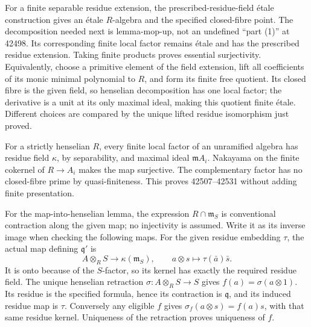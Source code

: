 For a finite separable residue extension, the prescribed-residue-field étale construction gives an étale \(R\)-algebra and the specified closed-fibre point. The decomposition needed next is lemma-mop-up, not an undefined ``part (1)'' at 42498. Its corresponding finite local factor remains étale and has the prescribed residue extension. Taking finite products proves essential surjectivity. Equivalently, choose a primitive element of the field extension, lift all coefficients of its monic minimal polynomial to \(R\), and form its finite free quotient. Its closed fibre is the given field, so henselian decomposition has one local factor; the derivative is a unit at its only maximal ideal, making this quotient finite étale. Different choices are compared by the unique lifted residue isomorphism just proved.

For a strictly henselian \(R\), every finite local factor of an unramified algebra has residue field \(\kappa\), by separability, and maximal ideal \(\mathfrak mA_i\). Nakayama on the finite cokernel of \(R\to A_i\) makes the map surjective. The complementary factor has no closed-fibre prime by quasi-finiteness. This proves 42507--42531 without adding finite presentation.

For the map-into-henselian lemma, the expression \(R\cap\mathfrak m_S\) is conventional contraction along the given map; no injectivity is assumed. Write it as its inverse image when checking the following maps. For the given residue embedding \(\tau\), the actual map defining \(\mathfrak q'\) is \[
A\otimes_RS\longrightarrow\kappa(\mathfrak m_S),
\qquad a\otimes s\longmapsto\tau(\bar a)\bar s.
\] It is onto because of the \(S\)-factor, so its kernel has exactly the required residue field. The unique henselian retraction \(\sigma:A\otimes_RS\to S\) gives \(f(a)=\sigma(a\otimes1)\). Its residue is the specified formula, hence its contraction is \(\mathfrak q\), and its induced residue map is \(\tau\). Conversely any eligible \(f\) gives \(\sigma_f(a\otimes s)=f(a)s\), with that same residue kernel. Uniqueness of the retraction proves uniqueness of \(f\).

